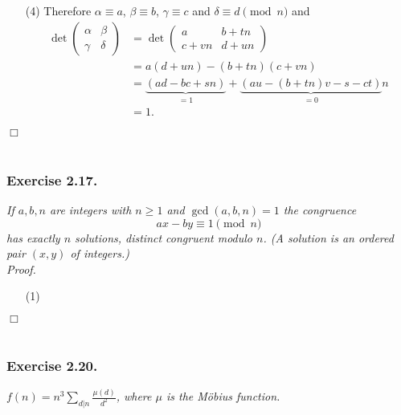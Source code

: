 \documentclass{article}
\begin{document}
\begin{enumerate}
\item[(4)]
  Therefore
  $\alpha \equiv a$, $\beta \equiv b$, $\gamma \equiv c$ and $\delta \equiv d \pmod{n}$
  and
  \begin{align*}
    \det
    \begin{pmatrix}
      \alpha & \beta \\
      \gamma & \delta
    \end{pmatrix}
    &=
    \det
    \begin{pmatrix}
      a & b + tn \\
      c + vn & d + un
    \end{pmatrix} \\
    &=
    a(d+un) - (b+tn)(c+vn) \\
    &=
    \underbrace{(ad - bc + sn)}_{= 1}
      + \underbrace{(au - (b+tn)v - s - ct)}_{= 0}n \\
    &= 1.
  \end{align*}
\end{enumerate}
$\Box$ \\\\






\subsubsection*{Exercise 2.17.}
\emph{If $a, b, n$ are integers with $n \geq 1$ and $\gcd(a,b,n) = 1$ the congruence
\[
  ax - by \equiv 1 \pmod{n}
\]
has exactly $n$ solutions, distinct congruent modulo $n$.
(A solution is an ordered pair $(x,y)$ of integers.)} \\



\emph{Proof.}
\begin{enumerate}
\item[(1)]
\end{enumerate}
$\Box$ \\\\






\subsubsection*{Exercise 2.20.}
\emph{$f(n) = n^3 \sum_{d|n} \frac{\mu(d)}{d^2}$, where $\mu$ is the M\"obius function.} \\
\end{document}
